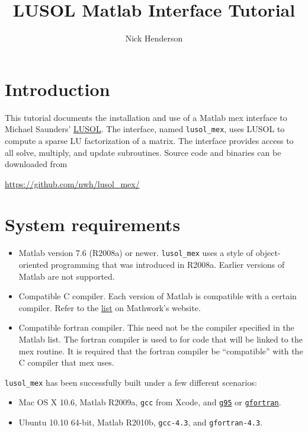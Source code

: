 \documentclass[11pt]{article}
\title{LUSOL Matlab Interface Tutorial}
\author{Nick Henderson}
\newcommand{\lmex}{\texttt{lusol\_mex}\xspace}
\begin{document}
\maketitle

\section{Introduction}

This tutorial documents the installation and use of a Matlab mex interface to
Michael Saunders'
\href{http://www.stanford.edu/group/SOL/software/lusol.html}{LUSOL}.  The
interface, named \lmex, uses LUSOL to compute a sparse LU factorization of a
matrix.  The interface provides access to all solve, multiply, and update
subroutines.  Source code and binaries can be downloaded from

\begin{center}
\url{https://github.com/nwh/lusol_mex/}
\end{center}

\section{System requirements}

\begin{itemize}
\item Matlab version 7.6 (R2008a) or newer.  \lmex uses a style of
  object-oriented programming that was introduced in R2008a.  Earlier versions
  of Matlab are not supported.
\item Compatible C compiler.  Each version of Matlab is compatible with a
  certain compiler.  Refer to the
  \href{http://www.mathworks.com/support/compilers/previous_releases.html}{list}
  on Mathwork's website.
\item Compatible fortran compiler.  This need not be the compiler specified in
  the Matlab list.  The fortran compiler is used to for code that will be
  linked to the mex routine.  It is required that the fortran compiler be
  ``compatible'' with the C compiler that mex uses.
\end{itemize}

\lmex has been successfully built under a few different scenarios:
\begin{itemize}
\item Mac OS X 10.6, Matlab R2009a, \texttt{gcc} from Xcode, and
  \href{http://www.g95.org/}{\tt g95} or
  \href{http://r.research.att.com/tools/}{\tt gfortran}.
\item Ubuntu 10.10 64-bit, Matlab R2010b, \texttt{gcc-4.3}, and
  \texttt{gfortran-4.3}.
\end{itemize}
\end{document}
